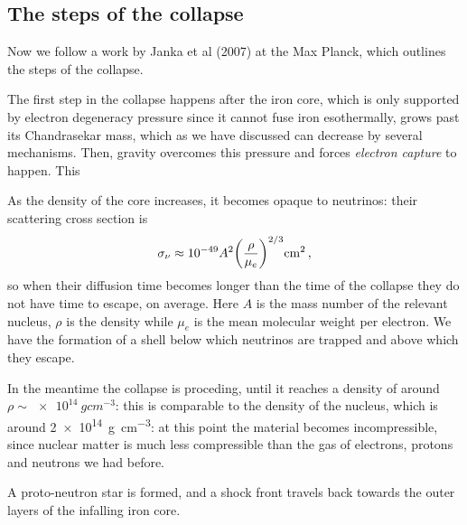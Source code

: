 \documentclass[main.tex]{subfiles}
\begin{document}

\subsection{The steps of the collapse}

Now we follow a work by Janka et al (2007) at the Max Planck, which outlines the steps of the collapse. 

The first step in the collapse happens after the iron core, which is only supported by electron degeneracy pressure since it cannot fuse iron esothermally, grows past its Chandrasekar mass, which as we have discussed can decrease by several mechanisms. Then, gravity overcomes this pressure and forces \emph{electron capture} to happen. This 

As the density of the core increases, it becomes opaque to neutrinos: their scattering cross section is
%
\begin{align}
  \sigma_{\nu } \approx \num{e-49} A^2 \qty(\frac{\rho }{\mu_{e}})^{2/3} \SI{}{cm^2}
\,,
\end{align}
%
so when their diffusion time becomes longer than the time of the collapse they do not have time to escape, on average.
Here \(A\) is the mass number of the relevant nucleus, \(\rho \) is the density while \(\mu_{e}\) is the mean molecular weight per electron.
We have the formation of a shell below which neutrinos are trapped and above which they escape.


In the meantime the collapse is proceding, until it reaches a density of around \(\rho \sim \SI{e14}{g cm^{-3}}\): this is comparable to the density of the nucleus, which is around \SI{2e14}{g cm^{-3}}: at this point the material becomes incompressible, since nuclear matter is much less compressible than the gas of electrons, protons and neutrons we had before.

A proto-neutron star is formed, and a shock front travels back towards the outer layers of the infalling iron core. 
\end{document}
